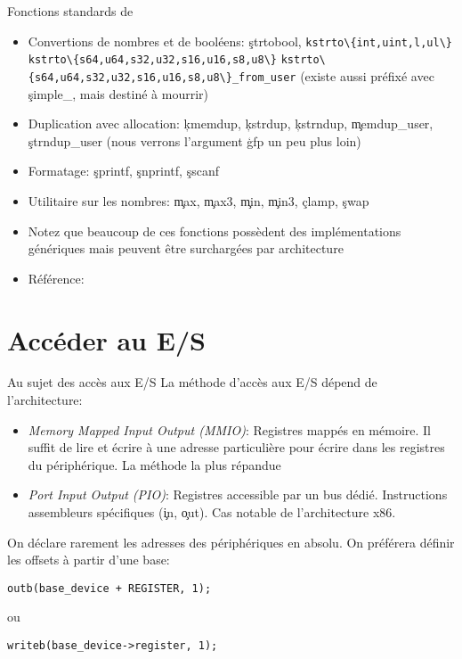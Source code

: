 \begin{frame}{Fonctions standards de }
  \begin{itemize} 
  \item  Convertions   de  nombres  et   de  booléens:  \c{strtobool},
    \lstinline+kstrto\{int,uint,l,ul\}+
    \lstinline+kstrto\{s64,u64,s32,u32,s16,u16,s8,u8\}+
    \lstinline+kstrto\{s64,u64,s32,u32,s16,u16,s8,u8\}_from_user+
    (existe aussi préfixé avec \c{simple_}, mais destiné à mourrir)
  \item   Duplication  avec   allocation:   \c{kmemdup},  \c{kstrdup},
    \c{kstrndup},  \c{memdup_user},   \c{strndup_user}  (nous  verrons
    l'argument \c{gfp} un peu plus loin)
  \item Formatage: \c{sprintf}, \c{snprintf}, \c{sscanf}
  \item  Utilitaire  sur  les  nombres:  \c{max},  \c{max3},  \c{min},
    \c{min3}, \c{clamp}, \c{swap}
  \item   Notez  que   beaucoup   de  ces   fonctions  possèdent   des
    implémentations  génériques  mais  peuvent  être  surchargées  par
    architecture
  \item Référence:  
  \end{itemize}
\end{frame} 

\section{Accéder au E/S}

\begin{frame}[fragile=singleslide]{Au sujet des accès aux E/S}
  La méthode d'accès aux E/S dépend de l'architecture:
  \begin{itemize} 
  \item \emph{Memory Mapped Input  Output (MMIO)}: Registres mappés en
    mémoire.  Il suffit  de lire et écrire à  une adresse particulière
    pour écrire dans les registres du périphérique. La méthode la plus
    répandue
  \item \emph{Port  Input Output  (PIO)}: Registres accessible  par un
    bus   dédié.    Instructions   assembleurs  spécifiques   (\c{in},
    \c{out}).  Cas notable de l'architecture x86.
  \end{itemize}

  On déclare  rarement les adresses  des périphériques en  absolu.  On
  préférera définir les offsets à partir d'une base:
  \begin{lstlisting}
outb(base_device + REGISTER, 1);
  \end{lstlisting} 
  ou 
  \begin{lstlisting}
writeb(base_device->register, 1);
  \end{lstlisting} 
\end{frame}


